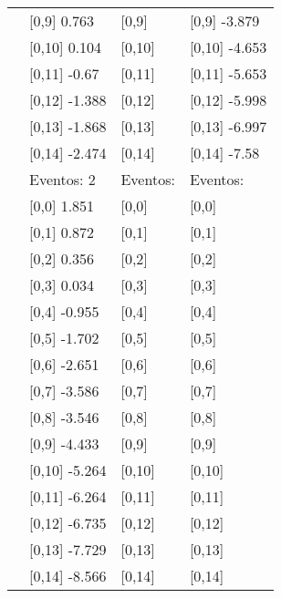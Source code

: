 \begin{table}
\begin{tabular}[t]{llll}
 & {}[0,9] 0.763 & {}[0,9] & {}[0,9] -3.879\\
 & {}[0,10] 0.104 & {}[0,10] & {}[0,10] -4.653\\
 & {}[0,11] -0.67 & {}[0,11] & {}[0,11] -5.653\\
 & {}[0,12] -1.388 & {}[0,12] & {}[0,12] -5.998\\
\addlinespace
 & {}[0,13] -1.868 & {}[0,13] & {}[0,13] -6.997\\
 & {}[0,14] -2.474 & {}[0,14] & {}[0,14] -7.58\\
 & Eventos:  2 & Eventos: & Eventos:\\
 & {}[0,0] 1.851 & {}[0,0] & {}[0,0]\\
 & {}[0,1] 0.872 & {}[0,1] & {}[0,1]\\
\addlinespace
 & {}[0,2] 0.356 & {}[0,2] & {}[0,2]\\
 & {}[0,3] 0.034 & {}[0,3] & {}[0,3]\\
 & {}[0,4] -0.955 & {}[0,4] & {}[0,4]\\
 & {}[0,5] -1.702 & {}[0,5] & {}[0,5]\\
 & {}[0,6] -2.651 & {}[0,6] & {}[0,6]\\
\addlinespace
1000 & {}[0,7] -3.586 & {}[0,7] & {}[0,7]\\
 & {}[0,8] -3.546 & {}[0,8] & {}[0,8]\\
 & {}[0,9] -4.433 & {}[0,9] & {}[0,9]\\
 & {}[0,10] -5.264 & {}[0,10] & {}[0,10]\\
 & {}[0,11] -6.264 & {}[0,11] & {}[0,11]\\
\addlinespace
 & {}[0,12] -6.735 & {}[0,12] & {}[0,12]\\
 & {}[0,13] -7.729 & {}[0,13] & {}[0,13]\\
 & {}[0,14] -8.566 & {}[0,14] & {}[0,14]\\
\bottomrule
\end{tabular}
\end{table}
